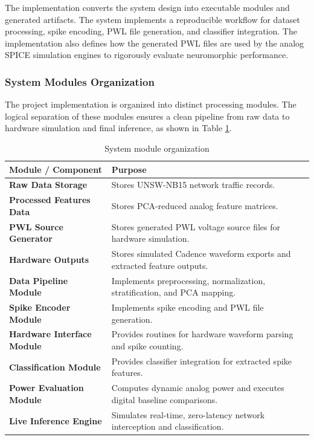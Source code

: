 \documentclass{ieeeaccess}
\begin{document}
The implementation converts the system design into executable modules and generated artifacts. The system implements a reproducible workflow for dataset processing, spike encoding, PWL file generation, and classifier integration. The implementation also defines how the generated PWL files are used by the analog SPICE simulation engines to rigorously evaluate neuromorphic performance.

\subsubsection{System Modules Organization}

The project implementation is organized into distinct processing modules. The logical separation of these modules ensures a clean pipeline from raw data to hardware simulation and final inference, as shown in Table \ref{tab:repo}.

\begin{table}[H]
\centering
\caption{System module organization}
\label{tab:repo}
\begin{tabular}{|p{}|p{}|}
\hline
\textbf{Module / Component} & \textbf{Purpose} \\
\hline
\textbf{Raw Data Storage} & Stores UNSW-NB15 network traffic records. \\
\hline
\textbf{Processed Features Data} & Stores PCA-reduced analog feature matrices. \\
\hline
\textbf{PWL Source Generator} & Stores generated PWL voltage source files for hardware simulation. \\
\hline
\textbf{Hardware Outputs} & Stores simulated Cadence waveform exports and extracted feature outputs. \\
\hline
\textbf{Data Pipeline Module} & Implements preprocessing, normalization, stratification, and PCA mapping. \\
\hline
\textbf{Spike Encoder Module} & Implements spike encoding and PWL file generation. \\
\hline

\textbf{Hardware Interface Module} & Provides routines for hardware waveform parsing and spike counting. \\
\hline
\textbf{Classification Module} & Provides classifier integration for extracted spike features. \\
\hline
\textbf{Power Evaluation Module} & Computes dynamic analog power and executes digital baseline comparisons. \\
\hline
\textbf{Live Inference Engine} & Simulates real-time, zero-latency network interception and classification. \\
\hline
\end{tabular}
\end{table}
\end{document}
